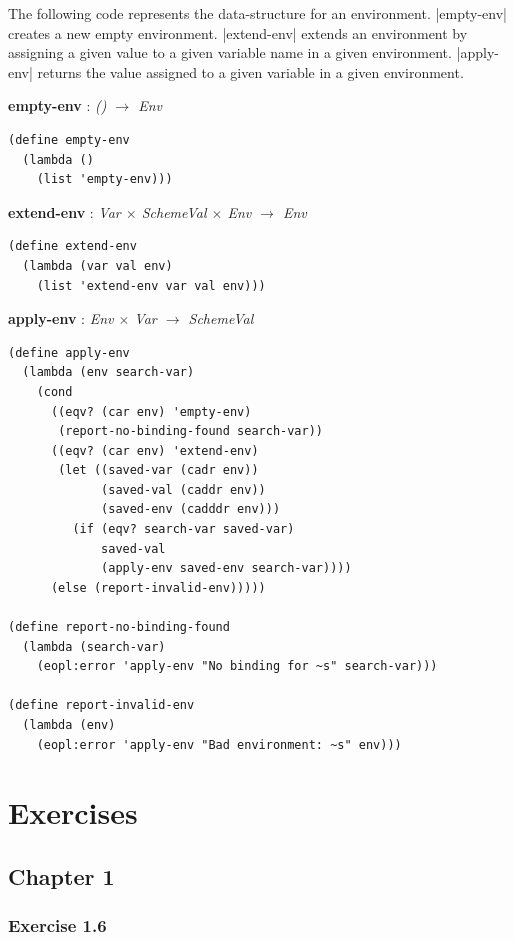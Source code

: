 \documentclass[a4paper]{article}
\begin{document}
The following code represents the data-structure for an environment. |empty-env| creates a new empty environment. |extend-env| extends an environment by assigning a given value to a given variable name in a given environment. |apply-env| returns the value assigned to a given variable in a given environment.

\textbf{empty-env} : \textit{() $\rightarrow$ Env}
\begin{lstlisting}[aboveskip=0pt]
(define empty-env
  (lambda ()
    (list 'empty-env)))
\end{lstlisting}

\textbf{extend-env} : \textit{Var $\times$ SchemeVal $\times$ Env $\rightarrow$ Env}
\begin{lstlisting}[aboveskip=0pt]
(define extend-env
  (lambda (var val env)
    (list 'extend-env var val env)))
\end{lstlisting}

\textbf{apply-env} : \textit{Env $\times$ Var $\rightarrow$ SchemeVal}
\begin{lstlisting}[aboveskip=0pt]
(define apply-env
  (lambda (env search-var)
    (cond
      ((eqv? (car env) 'empty-env)
       (report-no-binding-found search-var))
      ((eqv? (car env) 'extend-env)
       (let ((saved-var (cadr env))
             (saved-val (caddr env))
             (saved-env (cadddr env)))
         (if (eqv? search-var saved-var)
             saved-val
             (apply-env saved-env search-var))))
      (else (report-invalid-env)))))

(define report-no-binding-found
  (lambda (search-var)
    (eopl:error 'apply-env "No binding for ~s" search-var)))

(define report-invalid-env
  (lambda (env)
    (eopl:error 'apply-env "Bad environment: ~s" env)))
\end{lstlisting}

\newpage

\section{Exercises}

\subsection{Chapter 1}

\subsubsection{Exercise 1.6}
\end{document}

